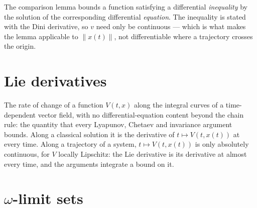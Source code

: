 The comparison lemma bounds a function satisfying a differential \emph{inequality} by the
solution of the corresponding differential \emph{equation}. The inequality is stated with the
Dini derivative, so $v$ need only be continuous — which is what makes the lemma applicable to
$\|x(t)\|$, not differentiable where a trajectory crosses the origin.




\section{Lie derivatives}

The rate of change of a function $V(t, x)$ along the integral curves of a time-dependent vector
field, with no differential-equation content beyond the chain rule: the quantity that every
Lyapunov, Chetaev and invariance argument bounds.  Along a classical solution it is the derivative
of $t \mapsto V(t, x(t))$ at every time.  Along a trajectory of a system, $t \mapsto V(t, x(t))$
is only absolutely continuous, for $V$ locally Lipschitz: the Lie derivative is its derivative at
almost every time, and the arguments integrate a bound on it.










\section{\texorpdfstring{$\omega$}{omega}-limit sets}

